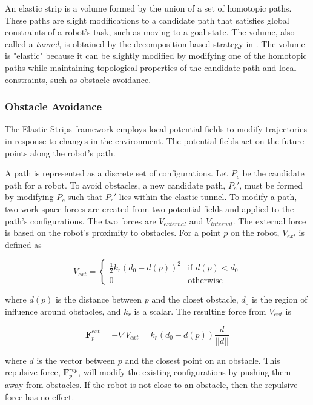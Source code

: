 \documentclass[10pt,conference]{ieeeconf}
\begin{document}
An elastic strip is a volume formed by the union of a set of homotopic paths. These paths are slight modifications to a candidate path that satisfies global constraints of a robot's task, such as moving to a goal state. The volume, also called a \emph{tunnel}, is obtained by the decomposition-based strategy in \cite{brock2001decomposition}. The volume is "elastic" because it can be slightly modified by modifying one of the homotopic paths while maintaining topological properties of the candidate path and local constraints, such as obstacle avoidance. 


\subsubsection{Obstacle Avoidance}

The Elastic Strips framework employs local potential fields to modify trajectories in response to changes in the environment. The potential fields act on the future points along the robot's path.

A path is represented as a discrete set of configurations. Let $P_c$ be the candidate path for a robot. To avoid obstacles, a new candidate path, $P_c'$, must be formed by modifying $P_c$ such that $P_c'$ lies within the elastic tunnel. To modify a path, two work space forces are created from two potential fields and applied to the path's configurations. The two forces are $V_{external}$ and $V_{internal}$. The external force is based on the robot's proximity to obstacles. For a point $p$ on the robot, $V_{ext}$ is defined as

\begin{equation}
V_{ext} = \begin{cases} 
      \frac{1}{2}k_r(d_0 - d(p))^2 & \text{if }  d(p) < d_0 \\
      0 & \text{otherwise}
   \end{cases}
\end{equation}


where $d(p)$ is the distance between $p$ and the closet obstacle, $d_0$ is the region of influence around obstacles, and $k_r$ is a scalar. The resulting force from $V_{ext}$ is

\begin{equation}
\textbf{F}^{ext}_p = -\nabla V_{ext} = k_r(d_0-d(p))\frac{d}{||d||}
\end{equation}

where $d$ is the vector between $p$ and the closest point on an obstacle. This repulsive force, $\textbf{F}^{rep}_p$, will modify the existing configurations by pushing them away from obstacles. If the robot is not close to an obstacle, then the repulsive force has no effect.
\end{document}
